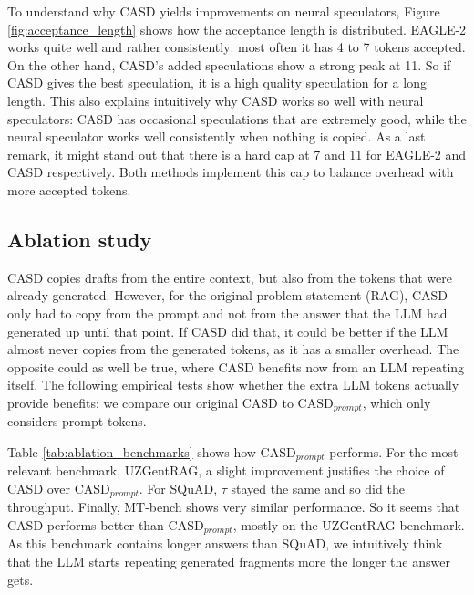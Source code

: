 To understand why CASD yields improvements on neural speculators, Figure \ref{fig:acceptance_length} shows how the acceptance length is distributed. EAGLE-2 works quite well and rather consistently: most often it has 4 to 7 tokens accepted. On the other hand, CASD's added speculations show a strong peak at 11. So if CASD gives the best speculation, it is a high quality speculation for a long length. This also explains intuitively why CASD works so well with neural speculators: CASD has occasional speculations that are extremely good, while the neural speculator works well consistently when nothing is copied. As a last remark, it might stand out that there is a hard cap at 7 and 11 for EAGLE-2 and CASD respectively. Both methods implement this cap to balance overhead with more accepted tokens.

\subsection{Ablation study}

CASD copies drafts from the entire context, but also from the tokens that were already generated. However, for the original problem statement (RAG), CASD only had to copy from the prompt and not from the answer that the LLM had generated up until that point. If CASD did that, it could be better if the LLM almost never copies from the generated tokens, as it has a smaller overhead. The opposite could as well be true, where CASD benefits now from an LLM repeating itself. The following empirical tests show whether the extra LLM tokens actually provide benefits: we compare our original CASD to CASD$_{prompt}$, which only considers prompt tokens.

Table \ref{tab:ablation_benchmarks} shows how CASD$_{prompt}$ performs. For the most relevant benchmark, UZGentRAG, a slight improvement justifies the choice of CASD over CASD$_{prompt}$. For SQuAD, $\tau$ stayed the same and so did the throughput. Finally, MT-bench shows very similar performance. So it seems that CASD performs better than CASD$_{prompt}$, mostly on the UZGentRAG benchmark. As this benchmark contains longer answers than SQuAD, we intuitively think that the LLM starts repeating generated fragments more the longer the answer gets.


